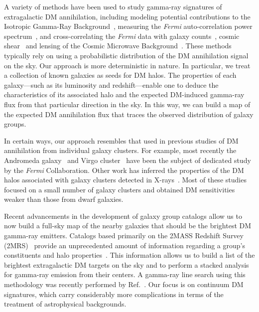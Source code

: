 A variety of methods have been used to study gamma-ray signatures of extragalactic DM annihilation, including modeling potential contributions to the Isotropic Gamma-Ray Background~\cite{Bengtsson:1990xf,Bergstrom:2001jj,Ullio:2002pj,Bottino:2004qi,Bertone:2004pz,Bringmann:2012ez,Ajello:2015mfa, DiMauro:2015tfa, Ackermann:2015tah, Feng:2016fkl}, measuring the \emph{Fermi} auto-correlation power spectrum~\cite{Ackermann:2012uf,Fornasa:2016ohl,Ando:2006cr,Ando:2013ff}, and cross-correlating the \emph{Fermi} data with galaxy counts~\cite{Branchini:2016glc, Xia:2011ax,Ando:2014aoa,Ando:2013xwa,Xia:2015wka,Regis:2015zka,Cuoco:2015rfa,Ando:2016ang}, cosmic shear~\cite{Camera:2014rja,Troster:2016sgf,Choi:2015mnp,Camera:2012cj,Shirasaki:2015nqp,Shirasaki:2014noa,Shirasaki:2016kol} and lensing of the Cosmic Microwave Background~\cite{Fornengo:2014cya, Feng:2016fkl}.  These methods typically rely on using a probabilistic distribution of the DM annihilation signal on the sky.  Our approach is more deterministic in nature.  In particular, we treat a collection of known galaxies as seeds for DM halos.  The properties of each galaxy---such as its luminosity and redshift---enable one to deduce the characteristics of its associated halo and the expected DM-induced gamma-ray flux from that particular direction in the sky.  In this way, we can build a map of the expected DM annihilation flux that traces  the observed distribution of galaxy groups. 

In certain ways, our approach resembles that used in previous studies  of DM annihilation from individual galaxy clusters.  For example, most recently the Andromeda galaxy~\cite{Ackermann:2017nya} and Virgo cluster~\cite{Ackermann:2015fdi} have been the subject of dedicated study by the \emph{Fermi} Collaboration.  Other work has inferred the properties of the DM halos associated with galaxy clusters detected in X-rays~\cite{Ackermann:2010rg, Ando:2012vu,Ackermann:2013iaq,Anderson:2015dpc,Rephaeli:2015nca,2016A&A...589A..33A,Liang:2016pvm}.  Most of these studies focused on a small number of galaxy clusters and obtained DM sensitivities weaker than those from dwarf galaxies.  

Recent advancements in the development of galaxy group catalogs allow us to now build a full-sky map of the nearby galaxies that should be the brightest DM gamma-ray emitters.  Catalogs based primarily on the 2MASS Redshift Survey (2MRS)~\cite{ Huchra:2011ii} provide an unprecedented amount of information regarding a group's constituents and halo properties~\cite{Tully:2015opa,2017ApJ...843...16K,Lu:2016vmu}.  This information allows us to build a list of the brightest extragalactic DM targets on the sky and to perform a stacked analysis for gamma-ray emission from their centers.  A gamma-ray line search using this methodology was recently performed by Ref.~\cite{Adams:2016alz}.  Our focus is on continuum DM signatures, which carry considerably more complications in terms of the treatment of astrophysical backgrounds.  

